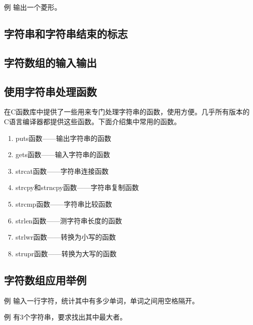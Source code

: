 例 输出一个菱形。
\subsection{字符串和字符串结束的标志}
\subsection{字符数组的输入输出}
\subsection{使用字符串处理函数}
在C函数库中提供了一些用来专门处理字符串的函数，使用方便。几乎所有版本的C语言编译器都提供这些函数。下面介绍集中常用的函数。
\begin{enumerate}
	\item puts函数——输出字符串的函数
	\item gets函数——输入字符串的函数
	\item strcat函数——字符串连接函数
	\item strcpy和strncpy函数——字符串复制函数
	\item strcmp函数——字符串比较函数
	\item strlen函数——测字符串长度的函数
	\item strlwr函数——转换为小写的函数
	\item strupr函数——转换为大写的函数
\end{enumerate}
\subsection{字符数组应用举例}
例 输入一行字符，统计其中有多少单词，单词之间用空格隔开。

例 有3个字符串，要求找出其中最大者。
